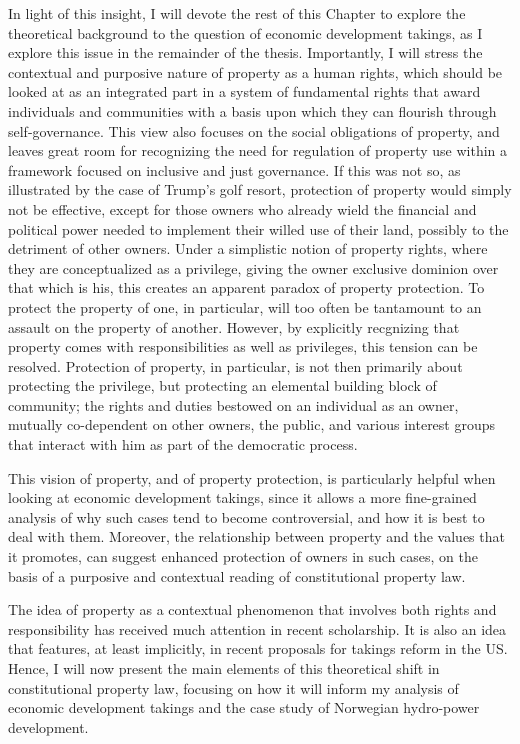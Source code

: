 In light of this insight, I will devote the rest of this Chapter to explore the theoretical background to the question of economic development takings, as I explore this issue in the remainder of the thesis. Importantly, I will stress the contextual and purposive nature of property as a human rights, which should be looked at as an integrated part in a system of fundamental rights that award individuals and communities with a basis upon which they can flourish through self-governance. This view also focuses on the social obligations of property, and leaves great room for recognizing the need for regulation of property use within a framework focused on inclusive and just governance. If this was not so, as illustrated by the case of Trump's golf resort, protection of property would simply not be effective, except for those owners who already wield the financial and political power needed to implement their willed use of their land, possibly to the detriment of other owners. Under a simplistic notion of property rights, where they are conceptualized as a privilege, giving the owner exclusive dominion over that which is his, this creates an apparent paradox of property protection. To protect the property of one, in particular, will too often be tantamount to an assault on the property of another. However, by explicitly recgnizing that property comes with responsibilities as well as privileges, this tension can be resolved. Protection of property, in particular, is not then primarily about protecting the privilege, but protecting an elemental building block of community; the rights and duties bestowed on an individual as an owner, mutually co-dependent on other owners, the public, and various interest groups that interact with him as part of the democratic process.

This vision of property, and of property protection, is particularly helpful when looking at economic development takings, since it allows a more fine-grained analysis of why such cases tend to become controversial, and how it is best to deal with them. Moreover, the relationship between property and the values that it promotes, can suggest enhanced protection of owners in such cases, on the basis of a purposive and contextual reading of constitutional property law. 

The idea of property as a contextual phenomenon that involves both rights and responsibility has received much attention in recent scholarship. It is also an idea that features, at least implicitly, in recent proposals for takings reform in the US. Hence, I will now present the main elements of this theoretical shift in constitutional property law, focusing on how it will inform my analysis of economic development takings and the case study of Norwegian hydro-power development.

